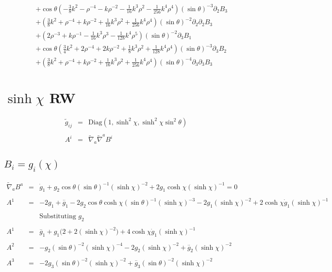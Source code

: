 \documentclass[10pt,letterpaper]{article}
\numberwithin{equation}{section}
\begin{document}
\begin{eqnarray}
&& + \cos\theta (- \tfrac{3}{8} k^2 -  \rho^{-4} -  k \rho^{-2} -  \tfrac{1}{16} k^3 \rho^2 -  \tfrac{1}{256} k^4 \rho^4) (\sin\theta)^{-3} \partial_{2}B_{3} \nonumber \\ 
&& + (\tfrac{3}{8} k^2 + \rho^{-4} + k \rho^{-2} + \tfrac{1}{16} k^3 \rho^2 + \tfrac{1}{256} k^4 \rho^4) (\sin\theta)^{-2} \partial_{2}\partial_{2}B_{3} \nonumber \\ 
&& + (2 \rho^{-3} + k \rho^{-1} -  \tfrac{1}{16} k^3 \rho^3 -  \tfrac{1}{128} k^4 \rho^5) (\sin\theta)^{-2} \partial_{3}B_{1} \nonumber \\ 
&& + \cos\theta (\tfrac{3}{4} k^2 + 2 \rho^{-4} + 2 k \rho^{-2} + \tfrac{1}{8} k^3 \rho^2 + \tfrac{1}{128} k^4 \rho^4) (\sin\theta)^{-3} \partial_{3}B_{2} \nonumber \\ 
&& + (\tfrac{3}{8} k^2 + \rho^{-4} + k \rho^{-2} + \tfrac{1}{16} k^3 \rho^2 + \tfrac{1}{256} k^4 \rho^4) (\sin\theta)^{-4} \partial_{3}\partial_{3}B_{3}
\end{eqnarray}
%
\section{$\sinh\chi$ RW}
\begin{eqnarray}
\tilde g_{ij} &=&\text{Diag}\left(1,\sinh^2\chi,\sinh^2\chi\sin^2\theta\right)
\\ \nonumber\\
A^i &=& \tilde\nabla_a\tilde\nabla^a B^i
\end{eqnarray}
\subsection{$B_i = g_i(\chi)$}
\begin{eqnarray}
\tilde\nabla_a B^a &=& \dot{g}_{1} + g_{2} \cos\theta (\sin\theta)^{-1} (\sinh\chi)^{-2} + 2 g_{1} \cosh\chi (\sinh\chi)^{-1} =0
\\ \nonumber\\
A^{1}&=& -2 g_{1} + \overset{..}{g}_{1} - 2 g_{2} \cos\theta \cosh\chi (\sin\theta)^{-1} (\sinh\chi)^{-3} - 2 g_{1} (\sinh\chi)^{-2} + 2 \cosh\chi \dot{g}_{1} (\sinh\chi)^{-1}
\\ \nonumber\\
&&\text{Substituting $g_2$}
\\ \nonumber\\
A^{1}&=& \overset{..}{g}_{1} + g_{1} \bigl(2 + 2 (\sinh\chi)^{-2}\bigr) + 4 \cosh\chi \dot{g}_{1} (\sinh\chi)^{-1}
\\ \nonumber\\
A^{2}&=& - g_{2} (\sin\theta)^{-2} (\sinh\chi)^{-4} - 2 g_{2} (\sinh\chi)^{-2} + \overset{..}{g}_{2} (\sinh\chi)^{-2}
\\ \nonumber\\
A^{3}&=& -2 g_{3} (\sin\theta)^{-2} (\sinh\chi)^{-2} + \overset{..}{g}_{3} (\sin\theta)^{-2} (\sinh\chi)^{-2}
\end{eqnarray}
\end{document}
